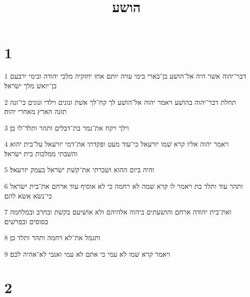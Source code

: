 

\title{הושע}


\chapter{1}

\par 1 דבר־יהוה אשׁר היה אל־הושׁע בן־בארי בימי עזיה יותם אחז יחזקיה מלכי יהודה ובימי ירבעם בן־יואשׁ מלך ישׂראל׃
\par 2 תחלת דבר־יהוה בהושׁע ויאמר יהוה אל־הושׁע לך קח־לך אשׁת זנונים וילדי זנונים כי־זנה תזנה הארץ מאחרי יהוה׃
\par 3 וילך ויקח את־גמר בת־דבלים ותהר ותלד־לו בן׃
\par 4 ויאמר יהוה אליו קרא שׁמו יזרעאל כי־עוד מעט ופקדתי את־דמי יזרעאל על־בית יהוא והשׁבתי ממלכות בית ישׂראל׃
\par 5 והיה ביום ההוא ושׁברתי את־קשׁת ישׂראל בעמק יזרעאל׃
\par 6 ותהר עוד ותלד בת ויאמר לו קרא שׁמה לא רחמה כי לא אוסיף עוד ארחם את־בית ישׂראל כי־נשׂא אשׂא להם׃
\par 7 ואת־בית יהודה ארחם והושׁעתים ביהוה אלהיהם ולא אושׁיעם בקשׁת ובחרב ובמלחמה בסוסים ובפרשׁים׃
\par 8 ותגמל את־לא רחמה ותהר ותלד בן׃
\par 9 ויאמר קרא שׁמו לא עמי כי אתם לא עמי ואנכי לא־אהיה לכם׃

\chapter{2}


